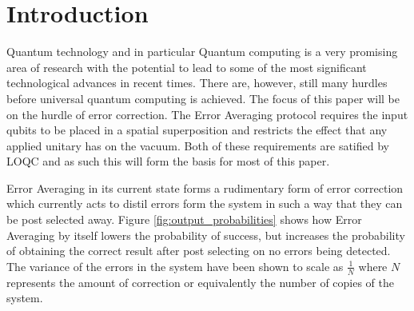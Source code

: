 \documentclass[aps,pra,twocolumn,superscriptaddress,numerical,floatfix]{revtex4-1}
\begin{document}
\pacs{}

\maketitle

\section{Introduction \label{intro}}
Quantum technology and in particular Quantum computing is a very promising area of research with the potential to lead to some of the most significant technological advances in recent times. There are, however, still many hurdles before universal quantum computing is achieved. The focus of this paper will be on the hurdle of error correction. The Error Averaging protocol requires the input qubits to be placed in a spatial superposition and restricts the effect that any applied unitary has on the vacuum. Both of these requirements are satified by LOQC and as such this will form the basis for most of this paper.

Error Averaging in its current state forms a rudimentary form of error correction which currently acts to distil errors form the system in such a way that they can be post selected away. Figure \ref{fig:output_probabilities} shows how Error Averaging by itself lowers the probability of success, but increases the probability of obtaining the correct result after post selecting on no errors being detected. The variance of the errors in the system have been shown to scale as $\frac{1}{N}$ where $N$ represents the amount of correction or equivalently the number of copies of the system.
\end{document}
